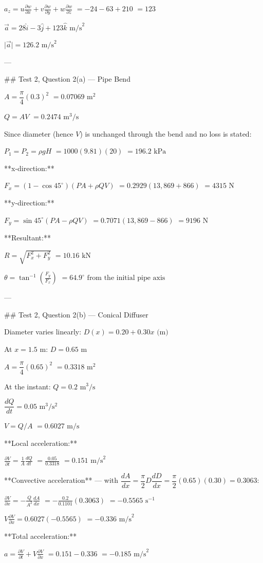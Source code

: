 $a_z = u\frac{\partial w}{\partial x}+v\frac{\partial w}{\partial y}+w\frac{\partial w}{\partial z}$
$= -24-63+210$
$= 123$

$\vec a = 28\hat i-3\hat j+123\hat k\text{ m/s}^2$

$\vert{}\vec a\vert{} = \boxed{126.2\text{ m/s}^2}$

---

## Test 2, Question 2(a) — Pipe Bend

$A = \dfrac{\pi}{4}(0.3)^2$
$= 0.07069\text{ m}^2$

$Q = AV$
$= 0.2474\text{ m}^3/\text{s}$

Since diameter (hence $V$) is unchanged through the bend and no loss is stated:

$P_1=P_2 = \rho g H$
$= 1000(9.81)(20)$
$= 196.2\text{ kPa}$

**x-direction:**

$F_x = (1-\cos45^\circ)(PA+\rho QV)$
$= 0.2929(13{,}869+866)$
$= \boxed{4315\text{ N}}$

**y-direction:**

$F_y = \sin45^\circ(PA-\rho QV)$
$= 0.7071(13{,}869-866)$
$= \boxed{9196\text{ N}}$

**Resultant:**

$R = \sqrt{F_x^2+F_y^2}$
$= \boxed{10.16\text{ kN}}$

$\theta = \tan^{-1}\left(\frac{F_y}{F_x}\right)$
$= \boxed{64.9^\circ \text{ from the initial pipe axis}}$

---

## Test 2, Question 2(b) — Conical Diffuser

Diameter varies linearly:
$D(x) = 0.20+0.30x\text{ (m)}$

At $x=1.5\text{ m}$:
$D=0.65\text{ m}$

$A=\dfrac{\pi}{4}(0.65)^2$
$=0.3318\text{ m}^2$

At the instant:
$Q=0.2\text{ m}^3/\text{s}$

$\dfrac{dQ}{dt}=0.05\text{ m}^3/\text{s}^2$

$V = Q/A$
$= 0.6027\text{ m/s}$

**Local acceleration:**

$\frac{\partial V}{\partial t} = \frac{1}{A}\frac{dQ}{dt}$
$= \frac{0.05}{0.3318}$
$= \boxed{0.151\text{ m/s}^2}$

**Convective acceleration** — with $\dfrac{dA}{dx} = \dfrac{\pi}{2}D\dfrac{dD}{dx} = \dfrac{\pi}{2}(0.65)(0.30)=0.3063$:

$\frac{\partial V}{\partial x} = -\frac{Q}{A^2}\frac{dA}{dx}$
$= -\frac{0.2}{0.1101}(0.3063)$
$= -0.5565\text{ s}^{-1}$

$V\frac{\partial V}{\partial x} = 0.6027(-0.5565)$
$= \boxed{-0.336\text{ m/s}^2}$

**Total acceleration:**

$a = \frac{\partial V}{\partial t}+V\frac{\partial V}{\partial x}$
$= 0.151-0.336$
$= \boxed{-0.185\text{ m/s}^2}$
